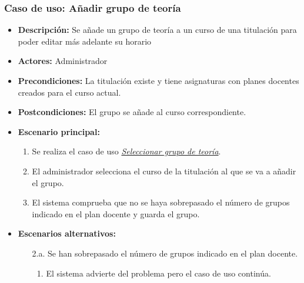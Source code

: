 \documentclass{book}
\begin{document}
\subsubsection*{Caso de uso: Añadir grupo de teoría}
\begin{itemize}
\item{\bf Descripción:} Se añade un grupo de teoría a un curso de una titulación para poder editar más adelante su horario
\item{\bf Actores:} Administrador
\item{\bf Precondiciones:} La titulación existe y tiene asignaturas con planes docentes creados para el curso actual.
\item{\bf Postcondiciones:} El grupo se añade al curso correspondiente.
\item{\bf Escenario principal:}
	\begin{enumerate}
	\item Se realiza el caso de uso {\em \hyperref[select_grupo]{Seleccionar grupo de teoría}}.
	\item El administrador selecciona el curso de la titulación al que se va a añadir el grupo.
	\item El sistema comprueba que no se haya sobrepasado el número de grupos indicado en el plan docente y guarda el grupo.
	\end{enumerate}
\item{\bf Escenarios alternativos:}
	\begin{itemize}
		\item[2.a.] Se han sobrepasado el número de grupos indicado en el plan docente.
		\begin{enumerate}
			\item El sistema advierte del problema pero el caso de uso continúa.
		\end{enumerate}
	\end{itemize}
\end{itemize}
\end{document}
